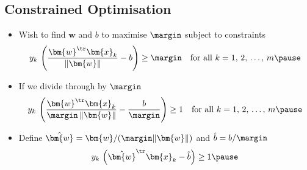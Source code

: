 \begin{slide}
\section[-1]{Constrained Optimisation}

\begin{PauseHighLight}
  \begin{itemize}
  \item Wish to find $\bm{w}$ and $b$ to maximise $\margin$ subject to
    constraints
    \begin{align*}
      y_k\,\left(\frac{\bm{w}^\tr \bm{x}_k}{\| \bm{w} \|} - b\right)
      \geq \margin
      \quad \mbox{for all $k=1,\,2,\,\ldots,\,m$}\pause
    \end{align*}
  \item If we divide through by $\margin$
    \begin{align*}
       y_k\,\left(\frac{\bm{w}^\tr \bm{x}_k}{\margin\, \| \bm{w} \|} -
      \frac{b}{\margin}\right) \geq 1
      \quad \mbox{for all $k=1,\,2,\,\ldots,\,m$}\pause
    \end{align*}
  \item Define $\hat{\bm{w}}=\bm{w}/(\margin\|\bm{w}\|)$ and
    $\hat{b}=b/\margin$
    \begin{align*}
       y_k\,\left(\hat{\bm{w}}^{\tr} \bm{x}_k - \hat{b}\right) \geq 1\pause
    \end{align*}
  \end{itemize}
\end{PauseHighLight}

\end{slide}


